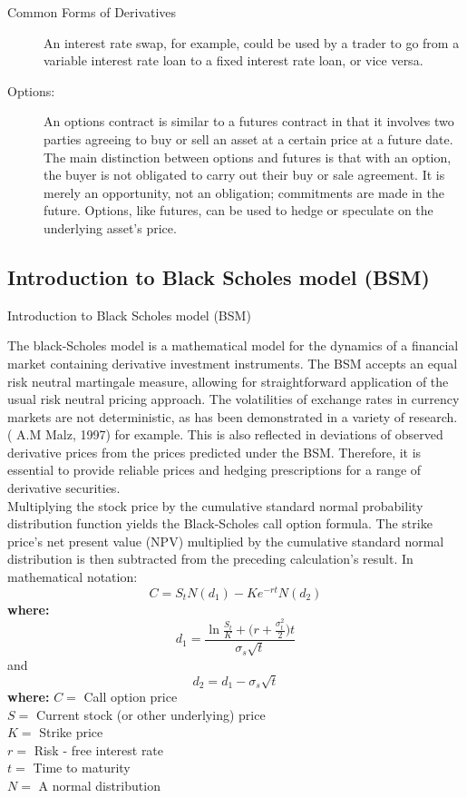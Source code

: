 \documentclass[unknownkeysallowed, compress]{beamer}
\theoremstyle{plain}
\begin{document}
\begin{frame}[allowframebreaks]{Common Forms of Derivatives}
\begin{description}
An interest rate swap, for example, could be used by a trader to go from a variable
interest rate loan to a fixed interest rate loan, or vice versa.
\item[Options: ] An options contract is similar to a futures contract in that it
involves two parties agreeing to buy or sell an asset at a certain price at a future date.
The main distinction between options and futures is that with an option, the buyer is not
obligated to carry out their buy or sale agreement. It is merely an opportunity, not an
obligation; commitments are made in the future. Options, like futures, can be used to
hedge or speculate on the underlying asset's price.
\end{description}

\end{frame}


\subsection{Introduction to Black Scholes model (BSM)}
\begin{frame}[allowframebreaks]{Introduction to Black Scholes model (BSM)}
\noindent
\par The black-Scholes model is a mathematical model for the dynamics of a financial market
containing derivative investment instruments. The BSM accepts an equal risk neutral
martingale measure, allowing for straightforward application of the usual risk neutral
pricing approach. The volatilities of exchange rates in currency markets are not
deterministic, as has been demonstrated in a variety of research. ( A.M Malz, 1997) for
example. This is also reflected in deviations of observed derivative prices from the prices
predicted under the BSM. Therefore, it is essential to provide reliable prices and hedging
prescriptions for a range of derivative securities.\\
Multiplying the stock price by the cumulative standard normal probability distribution
function yields the Black-Scholes call option formula. The strike price's net present value
(NPV) multiplied by the cumulative standard normal distribution is then subtracted from
the preceding calculation's result.
In mathematical notation:
$$
C = S_tN(d_1) - Ke^{-rt}N(d_2)
$$
\textbf{where:}
$$
d_1 = \frac{\ln\frac{S_t}{K}+\bigg(r+\frac{\sigma_t^2}{2}\bigg)t}{\sigma_s\sqrt{t}}
$$
and
$$
d_2 = d_1 - \sigma_s\sqrt{t}
$$
\textbf{where:}
$C = $ Call option price\\
$S = $ Current stock (or other underlying) price\\
$K = $ Strike price\\
$r = $ Risk - free interest rate\\
$t = $ Time to maturity\\
$N = $ A normal distribution

\end{frame}
\end{document}

